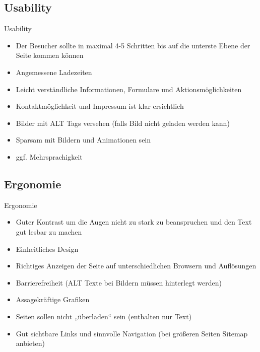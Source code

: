 \documentclass[xcolor=dvipsnames]{beamer}
\begin{document}
\subsection{Usability}
\begin{frame} %
  \begin{block}{Usability}
	\begin{itemize}
		\item Der Besucher sollte in maximal 4-5 Schritten bis auf die unterste Ebene der Seite kommen können
		\item Angemessene Ladezeiten
		\item Leicht verständliche Informationen, Formulare und Aktionsmöglichkeiten
		\item Kontaktmöglichkeit und Impressum ist klar ersichtlich
		\item Bilder mit ALT Tags versehen (falls Bild nicht geladen werden kann)
		\item Sparsam mit Bildern und Animationen sein
		\item ggf. Mehrsprachigkeit
	\end{itemize}
  \end{block}
\end{frame}

\subsection{Ergonomie}
\begin{frame} %
  \begin{block}{Ergonomie}
	\begin{itemize}
		\item Guter Kontrast um die Augen nicht zu stark zu beanspruchen und den Text gut lesbar zu machen
		\item Einheitliches Design
		\item Richtiges Anzeigen der Seite auf unterschiedlichen Browsern und Auflösungen
		\item Barrierefreiheit (ALT Texte bei Bildern müssen hinterlegt werden)
		\item Assagekräftige Grafiken
		\item Seiten sollen nicht „überladen“ sein (enthalten nur Text)
		\item Gut sichtbare Links und sinnvolle Navigation (bei größeren Seiten Sitemap anbieten)
	\end{itemize}
  \end{block}
\end{frame}
\end{document}
